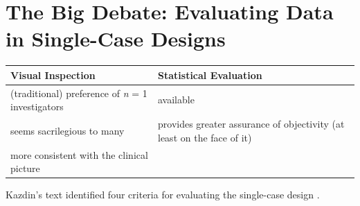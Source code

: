 \documentclass[
  english,
]{book}
\begin{document}
\hypertarget{the-big-debate-evaluating-data-in-single-case-designs}{%
\section{The Big Debate: Evaluating Data in Single-Case Designs}\label{the-big-debate-evaluating-data-in-single-case-designs}}

\begin{longtable}[]{@{}ll@{}}
\toprule
\begin{minipage}[b]{0.45\columnwidth}\raggedright
Visual Inspection\strut
\end{minipage} & \begin{minipage}[b]{0.49\columnwidth}\raggedright
Statistical Evaluation\strut
\end{minipage}\tabularnewline
\midrule
\endhead
\begin{minipage}[t]{0.45\columnwidth}\raggedright
(traditional) preference of \emph{n} = 1 investigators\strut
\end{minipage} & \begin{minipage}[t]{0.49\columnwidth}\raggedright
available\strut
\end{minipage}\tabularnewline
\begin{minipage}[t]{0.45\columnwidth}\raggedright
seems sacrilegious to many\strut
\end{minipage} & \begin{minipage}[t]{0.49\columnwidth}\raggedright
provides greater assurance of objectivity (at least on the face of it)\strut
\end{minipage}\tabularnewline
\begin{minipage}[t]{0.45\columnwidth}\raggedright
more consistent with the clinical picture\strut
\end{minipage} & \begin{minipage}[t]{0.49\columnwidth}\raggedright
\strut
\end{minipage}\tabularnewline
\bottomrule
\end{longtable}

Kazdin's text identified four criteria for evaluating the single-case design \citeyearpar{kazdin_research_2017}.
\end{document}
